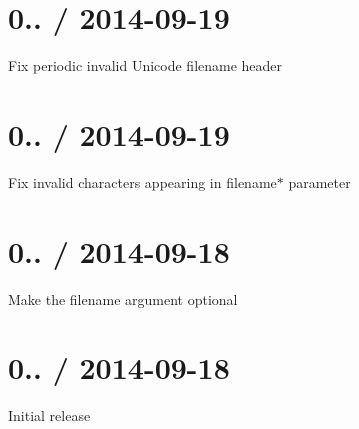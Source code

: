 \section*{0.. / 2014-\/09-\/19 }


\begin{DoxyItemize}
\item Fix periodic invalid Unicode filename header
\end{DoxyItemize}

\section*{0.. / 2014-\/09-\/19 }


\begin{DoxyItemize}
\item Fix invalid characters appearing in {\ttfamily filename$\ast$} parameter
\end{DoxyItemize}

\section*{0.. / 2014-\/09-\/18 }


\begin{DoxyItemize}
\item Make the {\ttfamily filename} argument optional
\end{DoxyItemize}

\section*{0.. / 2014-\/09-\/18 }


\begin{DoxyItemize}
\item Initial release 
\end{DoxyItemize}